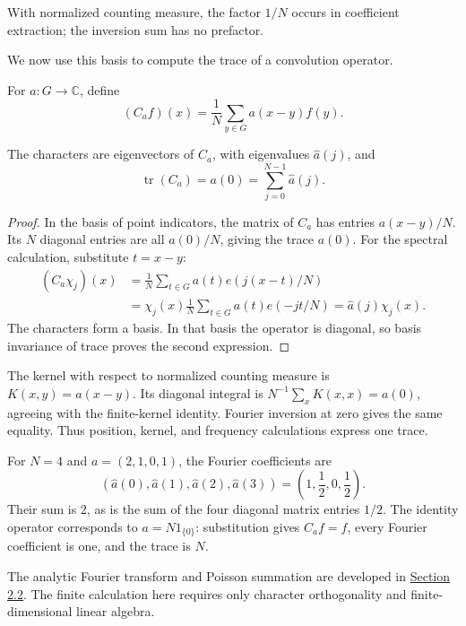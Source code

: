 With normalized counting measure, the factor $1/N$ occurs in coefficient extraction; the inversion sum has no prefactor.

We now use this basis to compute the trace of a convolution operator.

\begin{definition}[Convolution]\label{finite-convolution-operator}
For $a:G\to\mathbb C$, define
\[
(C_a f)(x)=\frac1N\sum_{y\in G}a(x-y)f(y).
\]
\end{definition}

\begin{proposition}\label{finite-fourier-trace}
The characters are eigenvectors of $C_a$, with eigenvalues $\widehat a(j)$, and
\[
\boxed{\operatorname{tr}(C_a)=a(0)=\sum_{j=0}^{N-1}\widehat a(j).}
\]
\end{proposition}

\begin{proof}
In the basis of point indicators, the matrix of $C_a$ has entries $a(x-y)/N$. Its $N$ diagonal entries are all $a(0)/N$, giving the trace $a(0)$. For the spectral calculation, substitute $t=x-y$:
\[
\begin{aligned}
(C_a\chi_j)(x)
&=\frac1N\sum_{t\in G}a(t)e(j(x-t)/N)\\
&=\chi_j(x)\frac1N\sum_{t\in G}a(t)e(-jt/N)
=\widehat a(j)\chi_j(x).
\end{aligned}
\]
The characters form a basis. In that basis the operator is diagonal, so basis invariance of trace proves the second expression.
\end{proof}

The kernel with respect to normalized counting measure is $K(x,y)=a(x-y)$. Its diagonal integral is $N^{-1}\sum_x K(x,x)=a(0)$, agreeing with the finite-kernel identity. Fourier inversion at zero gives the same equality. Thus position, kernel, and frequency calculations express one trace.

\begin{example}
For $N=4$ and $a=(2,1,0,1)$, the Fourier coefficients are
\[
(\widehat a(0),\widehat a(1),\widehat a(2),\widehat a(3))
=\left(1,\frac12,0,\frac12\right).
\]
Their sum is $2$, as is the sum of the four diagonal matrix entries $1/2$. The identity operator corresponds to $a=N1_{\{0\}}$: substitution gives $C_a f=f$, every Fourier coefficient is one, and the trace is $N$.
\end{example}

The analytic Fourier transform and Poisson summation are developed in \hyperref[v1a-ch02-s2]{Section 2.2}. The finite calculation here requires only character orthogonality and finite-dimensional linear algebra.
